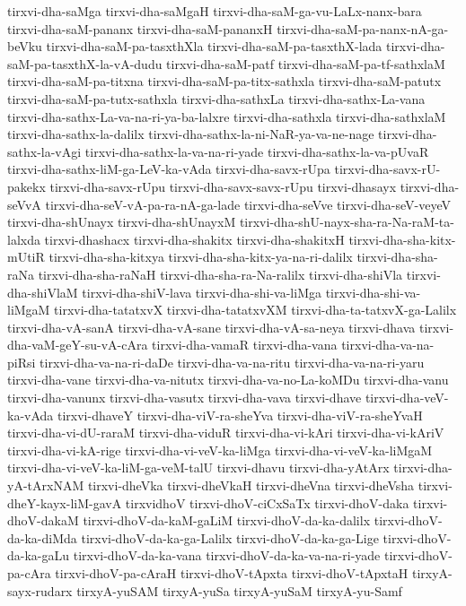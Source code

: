 {tirxvi-dha-saMga
tirxvi-dha-saMgaH
tirxvi-dha-saM-ga-vu-LaLx-nanx-bara
tirxvi-dha-saM-pananx
tirxvi-dha-saM-pananxH
tirxvi-dha-saM-pa-nanx-nA-ga-beVku
tirxvi-dha-saM-pa-tasxthXla
tirxvi-dha-saM-pa-tasxthX-lada
tirxvi-dha-saM-pa-tasxthX-la-vA-dudu
tirxvi-dha-saM-patf
tirxvi-dha-saM-pa-tf-sathxlaM
tirxvi-dha-saM-pa-titxna
tirxvi-dha-saM-pa-titx-sathxla
tirxvi-dha-saM-patutx
tirxvi-dha-saM-pa-tutx-sathxla
tirxvi-dha-sathxLa
tirxvi-dha-sathx-La-vana
tirxvi-dha-sathx-La-va-na-ri-ya-ba-lalxre
tirxvi-dha-sathxla
tirxvi-dha-sathxlaM
tirxvi-dha-sathx-la-dalilx
tirxvi-dha-sathx-la-ni-NaR-ya-va-ne-nage
tirxvi-dha-sathx-la-vAgi
tirxvi-dha-sathx-la-va-na-ri-yade
tirxvi-dha-sathx-la-va-pUvaR
tirxvi-dha-sathx-liM-ga-LeV-ka-vAda
tirxvi-dha-savx-rUpa
tirxvi-dha-savx-rU-pakekx
tirxvi-dha-savx-rUpu
tirxvi-dha-savx-savx-rUpu
tirxvi-dhasayx
tirxvi-dha-seVvA
tirxvi-dha-seV-vA-pa-ra-nA-ga-lade
tirxvi-dha-seVve
tirxvi-dha-seV-veyeV
tirxvi-dha-shUnayx
tirxvi-dha-shUnayxM
tirxvi-dha-shU-nayx-sha-ra-Na-raM-ta-lalxda
tirxvi-dhashacx
tirxvi-dha-shakitx
tirxvi-dha-shakitxH
tirxvi-dha-sha-kitx-mUtiR
tirxvi-dha-sha-kitxya
tirxvi-dha-sha-kitx-ya-na-ri-dalilx
tirxvi-dha-sha-raNa
tirxvi-dha-sha-raNaH
tirxvi-dha-sha-ra-Na-ralilx
tirxvi-dha-shiVla
tirxvi-dha-shiVlaM
tirxvi-dha-shiV-lava
tirxvi-dha-shi-va-liMga
tirxvi-dha-shi-va-liMgaM
tirxvi-dha-tatatxvX
tirxvi-dha-tatatxvXM
tirxvi-dha-ta-tatxvX-ga-Lalilx
tirxvi-dha-vA-sanA
tirxvi-dha-vA-sane
tirxvi-dha-vA-sa-neya
tirxvi-dhava
tirxvi-dha-vaM-geY-su-vA-cAra
tirxvi-dha-vamaR
tirxvi-dha-vana
tirxvi-dha-va-na-piRsi
tirxvi-dha-va-na-ri-daDe
tirxvi-dha-va-na-ritu
tirxvi-dha-va-na-ri-yaru
tirxvi-dha-vane
tirxvi-dha-va-nitutx
tirxvi-dha-va-no-La-koMDu
tirxvi-dha-vanu
tirxvi-dha-vanunx
tirxvi-dha-vasutx
tirxvi-dha-vava
tirxvi-dhave
tirxvi-dha-veV-ka-vAda
tirxvi-dhaveY
tirxvi-dha-viV-ra-sheYva
tirxvi-dha-viV-ra-sheYvaH
tirxvi-dha-vi-dU-raraM
tirxvi-dha-viduR
tirxvi-dha-vi-kAri
tirxvi-dha-vi-kAriV
tirxvi-dha-vi-kA-rige
tirxvi-dha-vi-veV-ka-liMga
tirxvi-dha-vi-veV-ka-liMgaM
tirxvi-dha-vi-veV-ka-liM-ga-veM-talU
tirxvi-dhavu
tirxvi-dha-yAtArx
tirxvi-dha-yA-tArxNAM
tirxvi-dheVka
tirxvi-dheVkaH
tirxvi-dheVna
tirxvi-dheVsha
tirxvi-dheY-kayx-liM-gavA
tirxvidhoV
tirxvi-dhoV-ciCxSaTx
tirxvi-dhoV-daka
tirxvi-dhoV-dakaM
tirxvi-dhoV-da-kaM-gaLiM
tirxvi-dhoV-da-ka-dalilx
tirxvi-dhoV-da-ka-diMda
tirxvi-dhoV-da-ka-ga-Lalilx
tirxvi-dhoV-da-ka-ga-Lige
tirxvi-dhoV-da-ka-gaLu
tirxvi-dhoV-da-ka-vana
tirxvi-dhoV-da-ka-va-na-ri-yade
tirxvi-dhoV-pa-cAra
tirxvi-dhoV-pa-cAraH
tirxvi-dhoV-tApxta
tirxvi-dhoV-tApxtaH
tirxyA-sayx-rudarx
tirxyA-yuSAM
tirxyA-yuSa
tirxyA-yuSaM
tirxyA-yu-Samf
}
